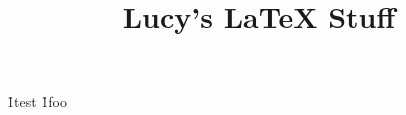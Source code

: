 \begin{html}
    \begin{head}
        \title{Lucy's LaTeX Stuff}
    \end{head}

    \begin{body}
     \h1{test}
     \h1{foo}
    \end{body}
\end{html}